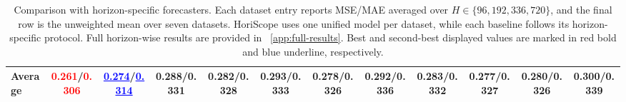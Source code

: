 \begin{table}[t]
{\begin{tabular}{l|ccccccccccc}
\midrule
Average & \textcolor{red}{\textbf{0.261}}/\textcolor{red}{\textbf{0.306}} & \textcolor{blue}{\underline{0.274}}/\textcolor{blue}{\underline{0.314}} & 0.288/0.331 & 0.282/0.328 & 0.293/0.333 & 0.278/0.326 & 0.292/0.336 & 0.283/0.332 & 0.277/0.327 & 0.280/0.326 & 0.300/0.339 \\
\bottomrule
\end{tabular}%
}
\caption{Comparison with horizon-specific forecasters. Each dataset entry reports MSE/MAE averaged over $H\in\{96,192,336,720\}$, and the final row is the unweighted mean over seven datasets. HoriScope uses one unified model per dataset, while each baseline follows its horizon-specific protocol. Full horizon-wise results are provided in ~\ref{app:full-results}. Best and second-best displayed values are marked in red bold and blue underline, respectively.}
\label{tab:main_horiscope}
\end{table}
